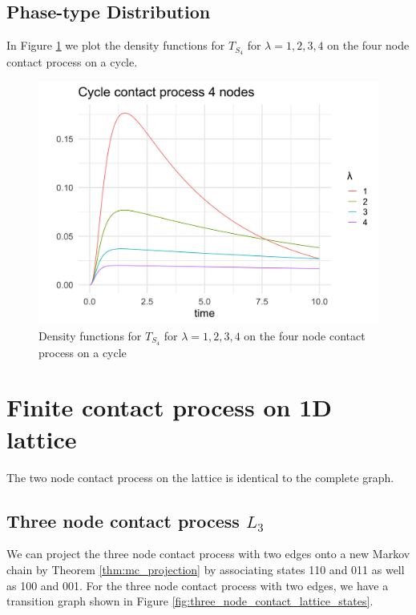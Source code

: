 \documentclass{article}
\theoremstyle{plain}
\theoremstyle{definition}
\theoremstyle{remark}
\numberwithin{equation}{section}
\begin{document}
\subsection{Phase-type Distribution}

In Figure \ref{fig:contact_4_cycle_phase_densities} we plot the density functions for $T_{S_4}$ for $\lambda = 1, 2, 3, 4$ on the four node contact process on a cycle.

\begin{figure}[h]
  \centering
    \includegraphics[width=.80\textwidth]{figures/cycle_4_contact_phase_densities.png}
   \caption{Density functions for $T_{S_4}$ for $\lambda = 1, 2, 3, 4$ on the four node contact process on a cycle}
  \label{fig:contact_4_cycle_phase_densities}
\end{figure}

\section{Finite contact process on 1D lattice}

The two node contact process on the lattice is identical to the complete graph.

\subsection{Three node contact process \texorpdfstring{$L_3$}{L3}}
We can project the three node contact process with two edges onto a new Markov chain by Theorem \ref{thm:mc_projection} by associating states 110 and 011 as well as 100 and 001.
For the three node contact process with two edges, we have a transition graph shown in Figure \ref{fig:three_node_contact_lattice_states}.
\end{document}
